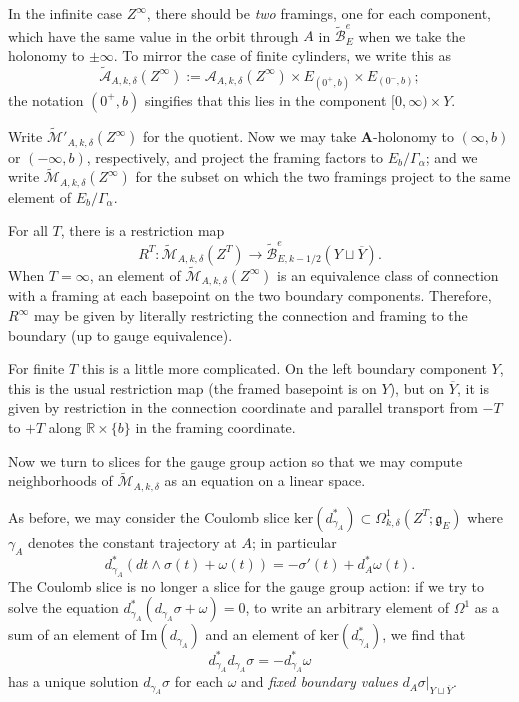\documentclass[10pt,a4paper]{amsart}
\theoremstyle{definition}
\theoremstyle{remark}
\numberwithin{figure}{qchap}
\begin{document}
In the infinite case $Z^\infty$, there should be \emph{two} framings, one for each component, which have the same value in the orbit through $A$ in $\widetilde{\mathcal B}^e_E$ when we take the holonomy to $\pm \infty$. To mirror the case of finite cylinders, we write this as $$\widetilde{\mathcal A}_{A,k,\delta}(Z^\infty) := \mathcal A_{A,k,\delta}(Z^\infty) \times E_{(0^+,b)} \times E_{(0^-, b)};$$ the notation $(0^+, b)$ singifies that this lies in the component $[0, \infty) \times Y$.

Write $\widetilde{\mathcal M}'_{A,k,\delta}(Z^\infty)$ for the quotient. Now we may take $\mathbf{A}$-holonomy to $(\infty, b)$ or $(-\infty, b)$, respectively, and project the framing factors to $E_b/\Gamma_\alpha$; and we write $\widetilde{\mathcal M}_{A,k,\delta}(Z^\infty)$ for the subset on which the two framings project to the same element of $E_b/\Gamma_\alpha$.

For all $T$, there is a restriction map $$R^T: \widetilde{\mathcal M}_{A,k,\delta}(Z^T) \to \widetilde{\mathcal B}^e_{E,k-1/2}(Y \sqcup \overline Y).$$ When $T = \infty$, an element of $\widetilde{\mathcal M}_{A,k,\delta}(Z^\infty)$ is an equivalence class of connection with a framing at each basepoint on the two boundary components. Therefore, $R^\infty$ may be given by literally restricting the connection and framing to the boundary (up to gauge equivalence). 

For finite $T$ this is a little more complicated. On the left boundary component $Y$, this is the usual restriction map (the framed basepoint is on $Y$), but on $\overline Y$, it is given by restriction in the connection coordinate and parallel transport from $-T$ to $+ T$ along $\mathbb R \times \{b\}$ in the framing coordinate.

Now we turn to slices for the gauge group action so that we may compute neighborhoods of $\widetilde{\mathcal M}_{A,k,\delta}$ as an equation on a linear space.

As before, we may consider the Coulomb slice $\text{ker}(d_{\gamma_A}^*) \subset \Omega^1_{k,\delta}(Z^T;\mathfrak g_E)$ where $\gamma_A$ denotes the constant trajectory at $A$; in particular $$d_{\gamma_A}^*(dt \wedge \sigma(t) + \omega(t)) = -\sigma'(t) + d_A^* \omega(t).$$ The Coulomb slice is no longer a slice for the gauge group action: if we try to solve the equation $d^*_{\gamma_A}(d_{\gamma_A} \sigma + \omega) = 0$, to write an arbitrary element of $\Omega^1$ as a sum of an element of $\text{Im}(d_{\gamma_A})$ and an element of $\text{ker}(d_{\gamma_A}^*)$, we find that 
$$d_{\gamma_A}^* d_{\gamma_A} \sigma = - d^*_{\gamma_A}\omega$$ 
has a unique solution $d_{\gamma_A} \sigma$ for each $\omega$ and \emph{fixed boundary values} $d_{A} \sigma \big|_{Y \sqcup \overline{Y}}$.
\end{document}

